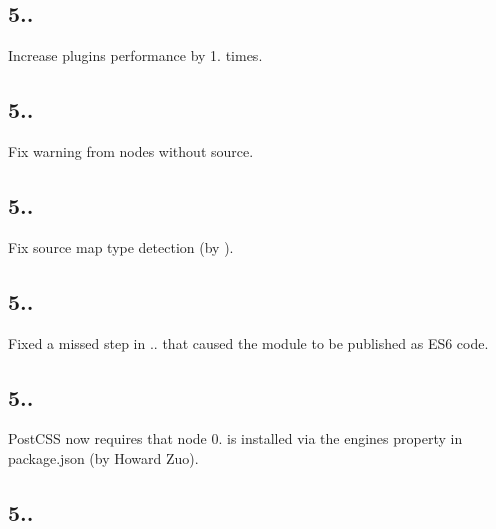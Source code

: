 \subsection*{5..}


\begin{DoxyItemize}
\item Increase plugins performance by 1. times.
\end{DoxyItemize}

\subsection*{5..}


\begin{DoxyItemize}
\item Fix warning from nodes without source.
\end{DoxyItemize}

\subsection*{5..}


\begin{DoxyItemize}
\item Fix source map type detection (by ).
\end{DoxyItemize}

\subsection*{5..}


\begin{DoxyItemize}
\item Fixed a missed step in {..} that caused the module to be published as E\+S6 code.
\end{DoxyItemize}

\subsection*{5..}


\begin{DoxyItemize}
\item Post\+C\+SS now requires that node 0. is installed via the engines property in package.\+json (by Howard Zuo).
\end{DoxyItemize}

\subsection*{5..}


